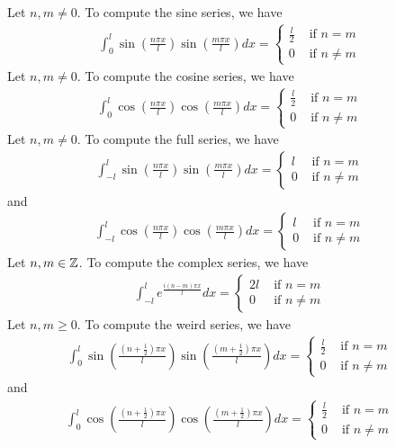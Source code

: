 \documentclass{report}
\begin{document}
\begin{mdframed}
Let $n,m\neq 0$. To compute the sine series, we have 
\begin{align*}
\int_0^l \sin (\frac{n \pi  x}{l})\sin (\frac{m \pi  x}{l})dx=\begin{cases}
  \frac{l}{2}& \text{ if $n= m$ } \\
  0& \text{ if $n\neq m$ }
\end{cases}
\end{align*}
Let $n,m\neq 0$. To compute the cosine series, we have 
\begin{align*}
\int_0^l \cos (\frac{n \pi  x}{l})\cos (\frac{m \pi  x}{l})dx= \begin{cases}
  \frac{l}{2}& \text{ if $n= m$ }\\
  0& \text{ if $n \neq m$ }
\end{cases}
\end{align*}
Let $n,m\neq 0$. To compute the full series, we have 
\begin{align*}
\int_{-l}^{l} \sin (\frac{n \pi  x}{l})\sin (\frac{m \pi  x}{l})dx= \begin{cases}
  l& \text{ if $n=m$ }\\
  0& \text{ if $n\neq  m$ }
\end{cases}
\end{align*}
and 
\begin{align*}
\int_{-l}^{l} \cos (\frac{n \pi  x}{l}) \cos ( \frac{m \pi  x}{l})dx=\begin{cases}
  l& \text{ if $n=m$ }\\
  0& \text{ if $n\neq m$ }
\end{cases}
\end{align*}
Let $n,m \in\mathbb{Z}$. To compute the complex series, we have 
\begin{align*}
\int_{-l}^{l} e^{\frac{i (n-m)\pi  x}{l}}dx= \begin{cases}
  2l & \text{ if $n=m$ }\\
  0& \text{ if $n\neq m$ }
\end{cases}
\end{align*}
Let $n,m\geq  0$. To compute the weird series, we have 
\begin{align*}
  \int_0^l \sin (\frac{(n+ \frac{1}{2})\pi  x}{l}) \sin (\frac{(m+ \frac{1}{2})\pi  x}{l})dx = \begin{cases}
    \frac{l}{2}& \text{ if $n=m$ }\\
    0& \text{ if $n\neq m$ }
  \end{cases}
\end{align*}
and 
\begin{align*}
  \int_0^l \cos (\frac{(n+ \frac{1}{2})\pi  x}{l}) \cos (\frac{(m+ \frac{1}{2})\pi  x}{l})dx = \begin{cases}
    \frac{l}{2}& \text{ if $n=m$ }\\
    0& \text{ if $n\neq m$ }
  \end{cases}
\end{align*}
\end{mdframed}
\end{document}
